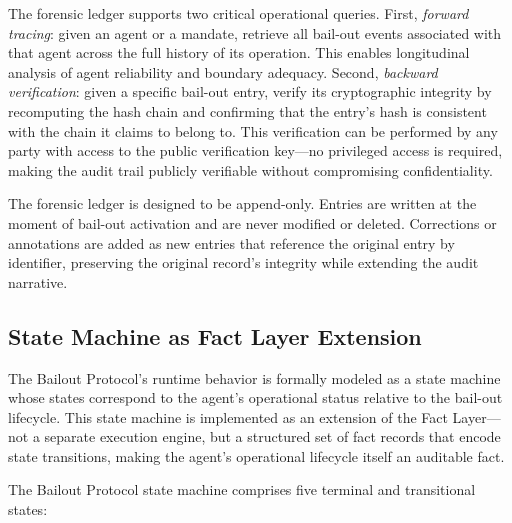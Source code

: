 The forensic ledger supports two critical operational queries. First, \textit{forward tracing}: given an agent or a mandate, retrieve all bail-out events associated with that agent across the full history of its operation. This enables longitudinal analysis of agent reliability and boundary adequacy. Second, \textit{backward verification}: given a specific bail-out entry, verify its cryptographic integrity by recomputing the hash chain and confirming that the entry's hash is consistent with the chain it claims to belong to. This verification can be performed by any party with access to the public verification key—no privileged access is required, making the audit trail publicly verifiable without compromising confidentiality.

The forensic ledger is designed to be append-only. Entries are written at the moment of bail-out activation and are never modified or deleted. Corrections or annotations are added as new entries that reference the original entry by identifier, preserving the original record's integrity while extending the audit narrative.

\subsection{State Machine as Fact Layer Extension}
\label{subsection:bailout-state-machine}

The Bailout Protocol's runtime behavior is formally modeled as a state machine whose states correspond to the agent's operational status relative to the bail-out lifecycle. This state machine is implemented as an extension of the Fact Layer—not a separate execution engine, but a structured set of fact records that encode state transitions, making the agent's operational lifecycle itself an auditable fact.

The Bailout Protocol state machine comprises five terminal and transitional states:

